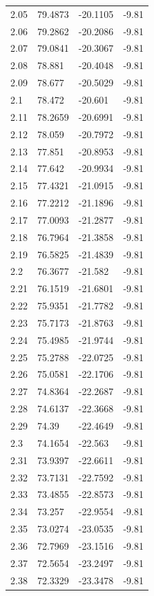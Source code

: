\begin{tabular}{llll}
2.05 & 79.4873 & -20.1105 & -9.81 \\
2.06 & 79.2862 & -20.2086 & -9.81 \\
2.07 & 79.0841 & -20.3067 & -9.81 \\
2.08 & 78.881 & -20.4048 & -9.81 \\
2.09 & 78.677 & -20.5029 & -9.81 \\
2.1 & 78.472 & -20.601 & -9.81 \\
2.11 & 78.2659 & -20.6991 & -9.81 \\
2.12 & 78.059 & -20.7972 & -9.81 \\
2.13 & 77.851 & -20.8953 & -9.81 \\
2.14 & 77.642 & -20.9934 & -9.81 \\
2.15 & 77.4321 & -21.0915 & -9.81 \\
2.16 & 77.2212 & -21.1896 & -9.81 \\
2.17 & 77.0093 & -21.2877 & -9.81 \\
2.18 & 76.7964 & -21.3858 & -9.81 \\
2.19 & 76.5825 & -21.4839 & -9.81 \\
2.2 & 76.3677 & -21.582 & -9.81 \\
2.21 & 76.1519 & -21.6801 & -9.81 \\
2.22 & 75.9351 & -21.7782 & -9.81 \\
2.23 & 75.7173 & -21.8763 & -9.81 \\
2.24 & 75.4985 & -21.9744 & -9.81 \\
2.25 & 75.2788 & -22.0725 & -9.81 \\
2.26 & 75.0581 & -22.1706 & -9.81 \\
2.27 & 74.8364 & -22.2687 & -9.81 \\
2.28 & 74.6137 & -22.3668 & -9.81 \\
2.29 & 74.39 & -22.4649 & -9.81 \\
2.3 & 74.1654 & -22.563 & -9.81 \\
2.31 & 73.9397 & -22.6611 & -9.81 \\
2.32 & 73.7131 & -22.7592 & -9.81 \\
2.33 & 73.4855 & -22.8573 & -9.81 \\
2.34 & 73.257 & -22.9554 & -9.81 \\
2.35 & 73.0274 & -23.0535 & -9.81 \\
2.36 & 72.7969 & -23.1516 & -9.81 \\
2.37 & 72.5654 & -23.2497 & -9.81 \\
2.38 & 72.3329 & -23.3478 & -9.81 \\

\end{tabular}
